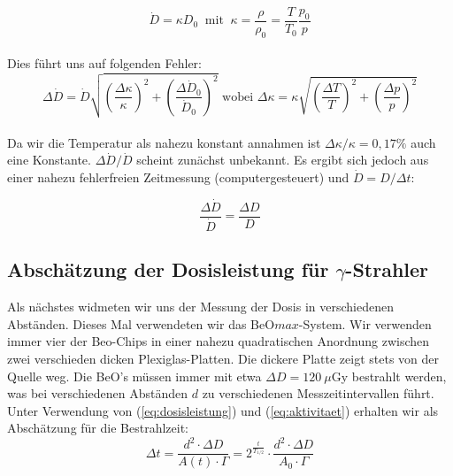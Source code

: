 \begin{equation*}
        \dot D = \kappa D_0 \ \text{ mit } \ \kappa = \frac{\rho}{\rho_0} = \frac{T}{T_0} \frac{p_0}{p}
\end{equation*}
\ \\
Dies führt uns auf folgenden Fehler:
\begin{equation*}
    \Delta \dot D = \dot D \sqrt{\left(\frac{\Delta \kappa}{\kappa}\right)^2 + \left( \frac{\Delta \dot D_0}{\dot D_0}\right)^2} \text{ wobei } \Delta \kappa = \kappa \sqrt{\left(\frac{\Delta T}{T}\right)^2 + \left(\frac{\Delta p}{p}\right)^2}
\end{equation*}
\ \\
Da wir die Temperatur als nahezu konstant annahmen ist $\Delta \kappa / \kappa = 0,17\%$ auch eine Konstante. $\Delta \dot D / \dot D$ scheint zunächst unbekannt. Es ergibt sich jedoch aus einer nahezu fehlerfreien Zeitmessung (computergesteuert) und $\dot D = D/\Delta t$:

\begin{equation*}
    \frac{\Delta \dot D}{\dot D} =  \frac{\Delta D}{D}
\end{equation*}

\subsection{Abschätzung der Dosisleistung für $\gamma$-Strahler}

Als nächstes widmeten wir uns der Messung der Dosis in verschiedenen Abständen. Dieses Mal verwendeten wir das BeO$max$-System. Wir verwenden immer vier der Beo-Chips in einer nahezu quadratischen Anordnung zwischen zwei verschieden dicken Plexiglas-Platten. Die dickere Platte zeigt stets von der Quelle weg.
Die BeO's müssen immer mit etwa $\Delta D = 120\ \mu$Gy bestrahlt werden, was bei verschiedenen Abständen $d$ zu verschiedenen Messzeitintervallen führt. Unter Verwendung von (\ref{eq:dosisleistung}) und (\ref{eq:aktivitaet}) erhalten wir als Abschätzung für die Bestrahlzeit:
\begin{equation}
		\Delta t 	= \frac{d^2 \cdot \Delta D}{A(t) \cdot \Gamma} 
					= 2^{\frac{t}{T_{1/2}}} \cdot \frac{d^2 \cdot \Delta D}{A_0 \cdot \Gamma} 
\end{equation}

